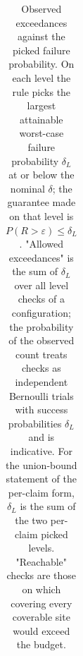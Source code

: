 \documentclass{iopjournal}
\begin{document}
{\renewcommand{\thetable}{S5.3}\small
\begin{longtable}[]{@{}
  >{\raggedright\arraybackslash}p{}
  >{\raggedright\arraybackslash}p{}
  >{\raggedright\arraybackslash}p{}
  >{\raggedright\arraybackslash}p{}
  >{\raggedright\arraybackslash}p{}
  >{\raggedright\arraybackslash}p{}
  >{\raggedright\arraybackslash}p{}
  >{\raggedright\arraybackslash}p{}
  >{\raggedright\arraybackslash}p{}
  >{\raggedright\arraybackslash}p{}
  >{\raggedright\arraybackslash}p{}
  >{\raggedright\arraybackslash}p{}@{}}
\caption{Observed exceedances against the picked failure probability. On each level the rule picks the largest attainable worst-case failure probability \(\delta_L\) at or below the nominal \(\delta\); the guarantee made on that level is \(P(R > \varepsilon) \le \delta_L\). "Allowed exceedances" is the sum of \(\delta_L\) over all level checks of a configuration; the probability of the observed count treats checks as independent Bernoulli trials with success probabilities \(\delta_L\) and is indicative. For the union-bound statement of the per-claim form, \(\delta_L\) is the sum of the two per-claim picked levels. "Reachable" checks are those on which covering every coverable site would exceed the budget.}\label{tab:S5.3}\\


\end{longtable}}
\end{document}
